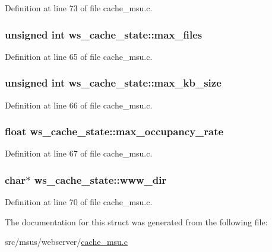 Definition at line 73 of file cache\-\_\-msu.\-c.

\hypertarget{structws__cache__state_aa02a5039b577f8928a97119ab2181b7c}{
\subsubsection[{max\-\_\-files}]{\setlength{\rightskip}{0pt plus 5cm}unsigned int ws\-\_\-cache\-\_\-state\-::max\-\_\-files}}\label{structws__cache__state_aa02a5039b577f8928a97119ab2181b7c}


Definition at line 65 of file cache\-\_\-msu.\-c.

\hypertarget{structws__cache__state_af2e1adc28ca4173da24578c5acdbea4a}{
\subsubsection[{max\-\_\-kb\-\_\-size}]{\setlength{\rightskip}{0pt plus 5cm}unsigned int ws\-\_\-cache\-\_\-state\-::max\-\_\-kb\-\_\-size}}\label{structws__cache__state_af2e1adc28ca4173da24578c5acdbea4a}


Definition at line 66 of file cache\-\_\-msu.\-c.

\hypertarget{structws__cache__state_ac7d43653d289083c65b36964054cb567}{
\subsubsection[{max\-\_\-occupancy\-\_\-rate}]{\setlength{\rightskip}{0pt plus 5cm}float ws\-\_\-cache\-\_\-state\-::max\-\_\-occupancy\-\_\-rate}}\label{structws__cache__state_ac7d43653d289083c65b36964054cb567}


Definition at line 67 of file cache\-\_\-msu.\-c.

\hypertarget{structws__cache__state_a6ff7b3a76f5436d08df63915fee176a0}{
\subsubsection[{www\-\_\-dir}]{\setlength{\rightskip}{0pt plus 5cm}char$\ast$ ws\-\_\-cache\-\_\-state\-::www\-\_\-dir}}\label{structws__cache__state_a6ff7b3a76f5436d08df63915fee176a0}


Definition at line 70 of file cache\-\_\-msu.\-c.



The documentation for this struct was generated from the following file\-:\begin{DoxyCompactItemize}
\item 
src/msus/webserver/\hyperlink{cache__msu_8c}{cache\-\_\-msu.\-c}\end{DoxyCompactItemize}
